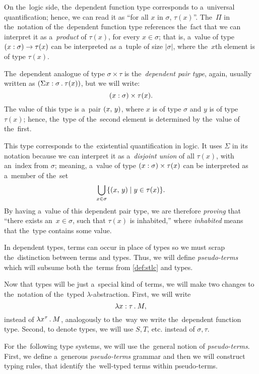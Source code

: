 On the~logic side, the~dependent function type corresponds to a~universal
quantification; hence, we can read it as ``for all $x$ in $\sigma$, $\tau(x)$''.
The~$\Pi$ in the~notation of the~dependent function type references the~fact
that we can interpret it as a~\emph{product} of $\tau(x)$, for every $x \in
\sigma$; that is, a~value of type $(x : \sigma) \to \tau(x)$ can be interpreted
as a~tuple of size $|\sigma|$, where the~$x$th element is of type $\tau(x)$.

The~dependent analogue of type $\sigma \times \tau$ is the~\emph{dependent pair
type}, again, usually written as ${(\Sigma x \stackrel{}: \sigma \, . \: \tau(x))}$,
but we will write:
\[
  (x \stackrel{}: \sigma) \times \tau(x).
\]
The value of this type is a~pair $(x, \, y)$, where $x$ is of type $\sigma$ and
$y$ is of type $\tau(x)$; hence, the~type of the~second element is determined by
the~value of the~first.

This type corresponds to the~existential quantification in logic. It uses
$\Sigma$ in its notation because we can interpret it as a~\emph{disjoint union}
of all $\tau(x)$, with an~index from $\sigma$; meaning, a~value of type $(x
\stackrel{}: \sigma) \times \tau(x)$ can be interpreted as a~member of the~set
\[
  \bigcup_{x \in \sigma} \{ (x, \, y) \mid y \in \tau(x) \}.
\]
By having a~value of this dependent pair type, we are therefore \emph{proving}
that ``there exists an~$x \in \sigma$, such that $\tau(x)$ is inhabited,'' where
\emph{inhabited} means that the~type contains some value.

In dependent types, terms can occur in place of types so we must scrap
the~distinction between terms and types. Thus, we will define
\emph{pseudo-terms} which will subsume both the~terms from \autoref{def:stlc}
and types.

Now that types will be just a~special kind of terms, we will make two changes to
the~notation of the~typed $\lambda$-abstraction. First, we will write
\[
  \lambda x \stackrel{}: \tau \, . \: M,
\]
instead of $\lambda x^\tau \, . \: M$, analogously to the~way we write the~dependent
function type. Second, to denote types, we will use $S, T$, etc. instead of
$\sigma, \tau.$


For the~following type systems, we will use the~general notion of
\emph{pseudo-terms}. First, we define a~generous \emph{pseudo-terms} grammar and
then we will construct typing rules, that identify the~well-typed terms within
pseudo-terms.

